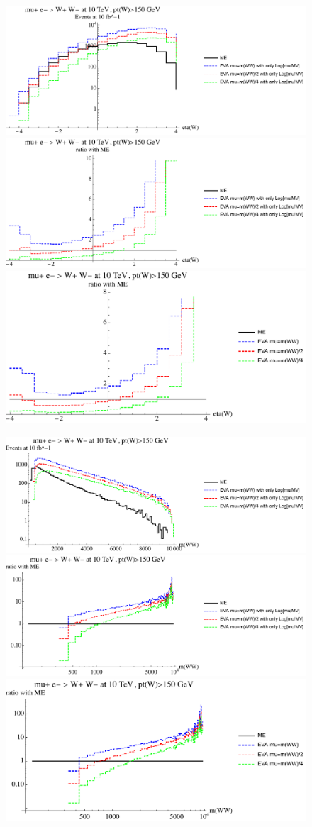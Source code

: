 \documentclass[a4paper,11pt]{article}
\begin{document}
\begin{figure}[ht]
\includegraphics[width=0.46\linewidth]{PlotDistr/WW_WW/10TeVolnlyptcut/plotetaW.pdf}
\includegraphics[width=0.46\linewidth]{PlotDistr/WW_WW/10TeVolnlyptcut/plotetaWratio1.pdf}
\includegraphics[width=0.46\linewidth]{PlotDistr/WW_WW/10TeVolnlyptcut/plotetaWratio2.pdf}
\end{figure}

\begin{figure}[ht]
\includegraphics[width=0.46\linewidth]{PlotDistr/WW_WW/10TeVolnlyptcut/plotmWW.pdf}
\includegraphics[width=0.46\linewidth]{PlotDistr/WW_WW/10TeVolnlyptcut/plotmWWratio1.pdf}
\includegraphics[width=0.46\linewidth]{PlotDistr/WW_WW/10TeVolnlyptcut/plotmWWratio2.pdf}
\end{figure}
\end{document}

